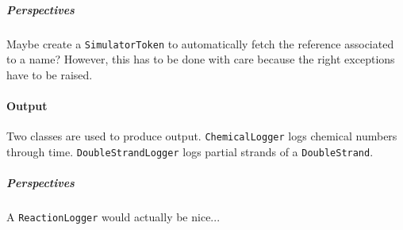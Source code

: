 \subparagraph{Perspectives} Maybe create a \texttt{SimulatorToken} to automatically fetch the reference associated to a name? However, this has to be done with care because the right exceptions have to be raised.

\paragraph{Output}

Two classes are used to produce output. \texttt{ChemicalLogger} logs chemical numbers through time. \texttt{DoubleStrandLogger} logs partial strands of a \texttt{DoubleStrand}.

\subparagraph{Perspectives} A \texttt{ReactionLogger} would actually be nice...
